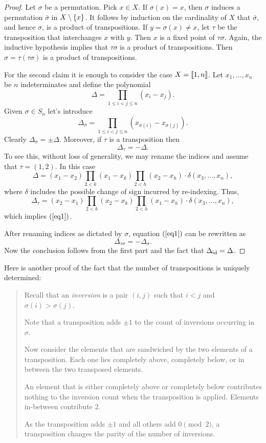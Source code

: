 \begin{proof} Let $\sigma$ be a permutation. Pick $x\in X$. If $\sigma(x)=x$, then $\sigma$ induces a permutation $\bar\sigma$ in $X\setminus\{x\}$. It follows by induction on the cardinality of $X$ that $\bar\sigma$, and hence $\sigma$, is a product of transpositions. If $y=\sigma(x)\ne x$, let $\tau$ be the transposition that interchanges $x$ with $y$. Then $x$ is a fixed point of $\tau\sigma$. Again, the inductive hypothesis implies that $\tau\sigma$ is a product of transpositions. Then $\sigma=\tau(\tau\sigma)$ is a product of transpositions.

For the second claim it is enough to consider the case $X=\llbracket1,n\rrbracket$. Let $x_1,
\dots,x_n$ be $n$ indeterminates and define the polynomial
$$
    \Delta = \prod_{1\le i<j\le n}(x_i-x_j).
$$
Given $\sigma\in S_n$ let's introduce
$$
    \Delta_\sigma = \prod_{1\le i<j\le n}(x_{\sigma(i)}-x_{\sigma(j)}).
$$
Clearly $\Delta_\sigma = \pm\Delta$. Moreover, if $\tau$ is a transposition then
\begin{equation}\label{eq1}
    \Delta_\tau = -\Delta.
\end{equation}
To see this, without loss of generality, we may rename the indices and assume that $\tau=(1,2)$. In this case
$$
    \Delta=(x_1-x_2)
        \prod_{2<k}(x_1-x_k)
        \prod_{2<h}(x_2-x_h)\cdot\delta(x_3,\dots,x_n),
$$
where $\delta$ includes the possible change of sign incurred by re-indexing. Thus,
$$
    \Delta_\tau=(x_2-x_1)
        \prod_{2<k}(x_2-x_k)
        \prod_{2<h}(x_1-x_h)\cdot\delta(x_3,\dots,x_n),
$$
which implies $(\ref{eq1})$.

After renaming indices as dictated by $\sigma$, equation $(\ref{eq1})$ can be rewritten as
$$
    \Delta_{\tau\sigma} = - \Delta_\sigma.
$$
Now the conclusion follows from the first part and the fact that $\Delta_{\operatorname{id}}=\Delta$.  \end{proof}

\medskip

\begin{rem}
    Here is another proof of the fact that the number of transpositions is uniquely determined:
    \begin{quote}\small
        Recall that an \textsl{inversion} is a pair $(i,j)$ such that $i<j$ and $\sigma(i)>\sigma(j)$.
    
        Note that a transposition adds $\pm1$ to the count of inversions occurring in~$\sigma$.
        
        Now consider the elements that are sandwiched by the two elements of a transposition. Each one lies completely above, completely below, or in between the two transposed elements.
    
        An element that is either completely above or completely below contributes nothing to the inversion count when the transposition is applied. Elements in-between contribute $2$.
        
        As the transposition adds $\pm1$ and all others add $0\pmod2$, a transposition changes the parity of the number of inversions.
    \end{quote}
\end{rem}

